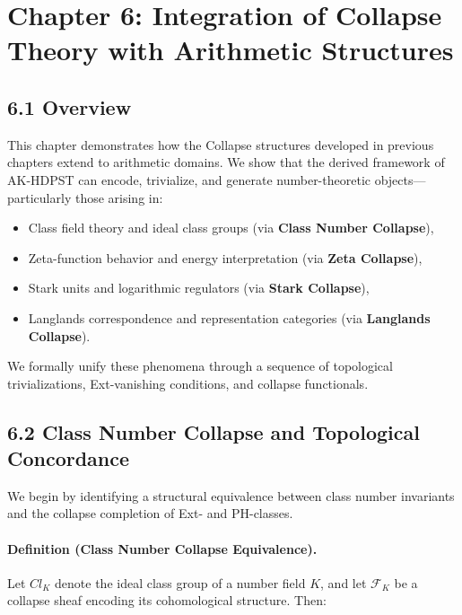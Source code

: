 \documentclass[11pt]{article}
\begin{document}
\section*{Chapter 6: Integration of Collapse Theory with Arithmetic Structures}

\subsection*{6.1 Overview}

This chapter demonstrates how the Collapse structures developed in previous chapters extend to arithmetic domains.  
We show that the derived framework of AK-HDPST can encode, trivialize, and generate number-theoretic objects—particularly those arising in:

\begin{itemize}
  \item Class field theory and ideal class groups (via \textbf{Class Number Collapse}),
  \item Zeta-function behavior and energy interpretation (via \textbf{Zeta Collapse}),
  \item Stark units and logarithmic regulators (via \textbf{Stark Collapse}),
  \item Langlands correspondence and representation categories (via \textbf{Langlands Collapse}).
\end{itemize}

We formally unify these phenomena through a sequence of topological trivializations, Ext-vanishing conditions, and collapse functionals.

\subsection*{6.2 Class Number Collapse and Topological Concordance}

We begin by identifying a structural equivalence between class number invariants and the collapse completion of Ext- and PH-classes.

\paragraph{Definition (Class Number Collapse Equivalence).}
Let \( Cl_K \) denote the ideal class group of a number field \( K \), and let \( \mathcal{F}_K \) be a collapse sheaf encoding its cohomological structure. Then:
\end{document}
